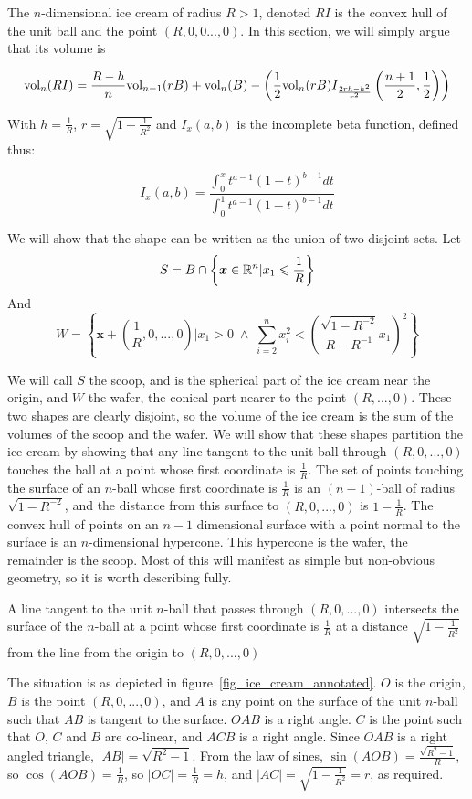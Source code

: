 The $n$-dimensional ice cream of radius $R>1$, denoted $RI$ is the convex hull of the unit ball and the point $(R,0,0...,0)$. In this section, we will simply argue that its volume is

$$
\mbox{vol}_n(RI) = \frac{R-h}{n} \mbox{vol}_{n-1}(rB) + \mbox{vol}_n(B) - \left(\frac{1}{2}\mbox{vol}_n(rB) I_{\frac{2rh-h^2}{r^2}}\left(\frac{n+1}{2}, \frac{1}{2}\right)\right)
$$

With $h = \frac{1}{R}$, $r = \sqrt{1-\frac{1}{R^2}}$ and $I_x(a,b)$ is the incomplete beta function, defined thus:

$$
I_x(a,b) = \frac{\int^x_0 t^{a-1}(1-t)^{b-1}dt}{\int^1_0 t^{a-1}(1-t)^{b-1} dt}
$$

We will show that the shape can be written as the union of two disjoint sets. Let
$$
S = B \cap \left\{\bm{x} \in \mathbb{R}^n | x_1 \leqslant \frac{1}{R}\right\}
$$
And
$$
W = \left\{\bm{x} + \left(\frac{1}{R}, 0, ..., 0\right) | x_1 > 0 \; \wedge \; \sum^{n}_{i=2} x_i^2 < \left(\frac{\sqrt{1-R^{-2}}}{R-R^{-1}} x_1\right)^2 \right\}
$$

We will call $S$ the scoop, and is the spherical part of the ice cream near the origin, and $W$ the wafer, the conical part nearer to the point $(R,...,0)$. These two shapes are clearly disjoint, so the volume of the ice cream is the sum of the volumes of the scoop and the wafer. We will show that these shapes partition the ice cream by showing that any line tangent to the unit ball through $(R,0,...,0)$ touches the ball at a point whose first coordinate is $\frac{1}{R}$.  The set of points touching the surface of an $n$-ball whose first coordinate is $\frac{1}{R}$ is an $(n-1)$-ball of radius $\sqrt{1-R^{-2}}$, and the distance from this surface to $(R,0,...,0)$ is $1-\frac{1}{R}$. The convex hull of points on an $n-1$ dimensional surface with a point normal to the surface is an $n$-dimensional hypercone. This hypercone is the wafer, the remainder is the scoop. Most of this will manifest as simple but non-obvious geometry, so it is worth describing fully.

\begin{proposition}
A line tangent to the unit $n$-ball that passes through $(R,0,...,0)$ intersects the surface of the $n$-ball at a point whose first coordinate is $\frac{1}{R}$ at a distance $\sqrt{1-\frac{1}{R^2}}$ from the line from the origin to $(R,0,...,0)$
\end{proposition}

The situation is as depicted in figure~\ref{fig_ice_cream_annotated}. $O$ is the origin, $B$ is the point $(R,0,...,0)$, and $A$ is any point on the surface of the unit $n$-ball such that $AB$ is tangent to the surface. $OAB$ is a right angle. $C$ is the point such that $O$, $C$ and $B$ are co-linear, and $ACB$ is a right angle. Since $OAB$ is a right angled triangle, $|AB| = \sqrt{R^2-1}$. From the law of sines, $\sin(AOB) = \frac{\sqrt{R^2-1}}{R}$, so $\cos(AOB) = \frac{1}{R}$, so $|OC| = \frac{1}{R} = h$, and $|AC| = \sqrt{1-\frac{1}{R^2}} = r$, as required.

